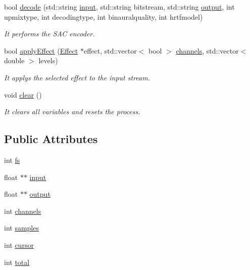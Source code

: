 \begin{DoxyCompactItemize}
bool \hyperlink{class_process_manager_ad882d23c995a27ac064826412b5127a8}{decode} (std\+::string \hyperlink{class_process_manager_aafb2937f6a2f261b1581917ba872ba9b}{input}, std\+::string bitstream, std\+::string \hyperlink{class_process_manager_a135c866f06b0042c2835cd9ecefa05f3}{output}, int upmixtype, int decodingtype, int binauralquality, int hrtfmodel)
\begin{DoxyCompactList}\small\item\em It performs the S\+AC encoder. \end{DoxyCompactList}\item 
bool \hyperlink{class_process_manager_a91a8718847e535f297756fa8604dc8f4}{apply\+Effect} (\hyperlink{class_effect}{Effect} $\ast$effect, std\+::vector$<$ bool $>$ \hyperlink{class_process_manager_a325109138cabf342e5beacf7af67480b}{channels}, std\+::vector$<$ double $>$ levels)
\begin{DoxyCompactList}\small\item\em It applys the selected effect to the input stream. \end{DoxyCompactList}\item 
\mbox{\label{class_process_manager_a9c807d64f58ca890b9b4acde3f1c1bb2}} 
void \hyperlink{class_process_manager_a9c807d64f58ca890b9b4acde3f1c1bb2}{clear} ()
\begin{DoxyCompactList}\small\item\em It clears all variables and resets the process. \end{DoxyCompactList}\end{DoxyCompactItemize}
\subsection*{Public Attributes}
\begin{DoxyCompactItemize}
\item 
int \hyperlink{class_process_manager_ae7ce9ead957c4f78d74206baf1837a59}{fs}
\item 
float $\ast$$\ast$ \hyperlink{class_process_manager_aafb2937f6a2f261b1581917ba872ba9b}{input}
\item 
float $\ast$$\ast$ \hyperlink{class_process_manager_a135c866f06b0042c2835cd9ecefa05f3}{output}
\item 
int \hyperlink{class_process_manager_a325109138cabf342e5beacf7af67480b}{channels}
\item 
int \hyperlink{class_process_manager_aac9c5dea3ac0ed72df1f6f780c62010a}{samples}
\item 
int \hyperlink{class_process_manager_a337af1b32b2f6bf94ed98ef98e6d1226}{cursor}
\item 
int \hyperlink{class_process_manager_abcf97b9835a8dfb0d55e37069663cda9}{total}
\end{DoxyCompactItemize}


